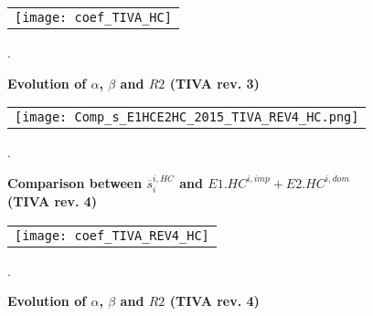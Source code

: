 \documentclass[12pt,a4paper]{article}
\begin{document}
\begin{figure}[H]
	\centering
	\caption{\footnotesize{\textbf{Evolution of $\alpha$, $\beta$ and $R2$ (TIVA rev. 3)}}}
	\begin{tabular}{c}
		\texttt{[image: coef\_TIVA\_HC]}\\
	\end{tabular}
	\label{fig:evolution_b_TiVA}
	.
\end{figure}

\begin{figure}[H]
	\centering
	\caption{\footnotesize{\textbf{Comparison between $\overline{s}_{i}^{i,HC}$ and $E1.HC^{i,imp}+E2.HC^{i,dom}$ (TIVA rev. 4)}}}
	\begin{tabular}{c}
		\texttt{[image: Comp\_s\_E1HCE2HC\_2015\_TIVA\_REV4\_HC.png]}\\
	\end{tabular}
	\label{fig:ratiodir_TiVA_REV4}
	.
\end{figure}

\begin{figure}[H]
	\centering
	\caption{\footnotesize{\textbf{Evolution of $\alpha$, $\beta$ and $R2$ (TIVA rev. 4)}}}
	\begin{tabular}{c}
		\texttt{[image: coef\_TIVA\_REV4\_HC]}\\
	\end{tabular}
	\label{fig:evolution_b_TiVA_REV4}
	.
\end{figure}


\newpage
\end{document}
